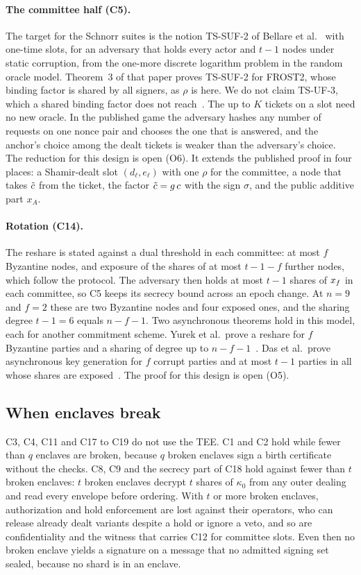 \paragraph{The committee half (C5).} The target for the Schnorr suites is the notion TS-SUF-2 of Bellare et al.~\cite{BTA22} with one-time slots, for an adversary that holds every actor and $t - 1$ nodes under static corruption, from the one-more discrete logarithm problem in the random oracle model. Theorem~3 of that paper proves TS-SUF-2 for FROST2, whose binding factor is shared by all signers, as $\rho$ is here. We do not claim TS-UF-3, which a shared binding factor does not reach~\cite[Section~4.4]{BTA22}. The up to $K$ tickets on a slot need no new oracle. In the published game the adversary hashes any number of requests on one nonce pair and chooses the one that is answered, and the anchor's choice among the dealt tickets is weaker than the adversary's choice. The reduction for this design is open (O6). It extends the published proof in four places: a Shamir-dealt slot $(d_\ell, e_\ell)$ with one $\rho$ for the committee, a node that takes $\tilde{c}$ from the ticket, the factor $\tilde{c} = g\,c$ with the sign $\sigma$, and the public additive part $x_A$.

\paragraph{Rotation (C14).} The reshare is stated against a dual threshold in each committee: at most $f$ Byzantine nodes, and exposure of the shares of at most $t - 1 - f$ further nodes, which follow the protocol. The adversary then holds at most $t - 1$ shares of $x_{f}$ in each committee, so C5 keeps its secrecy bound across an epoch change. At $n = 9$ and $f = 2$ these are two Byzantine nodes and four exposed ones, and the sharing degree $t - 1 = 6$ equals $n - f - 1$. Two asynchronous theorems hold in this model, each for another commitment scheme. Yurek et al.\ prove a reshare for $f$ Byzantine parties and a sharing of degree up to $n - f - 1$~\cite[Theorem~1]{YXXM23}. Das et al.\ prove asynchronous key generation for $f$ corrupt parties and at most $t - 1$ parties in all whose shares are exposed~\cite[Theorem~1]{DXKR23}. The proof for this design is open (O5).

\subsection{When enclaves break}\label{sec:tee-break}

C3, C4, C11 and C17 to C19 do not use the TEE. C1 and C2 hold while fewer than $q$ enclaves are broken, because $q$ broken enclaves sign a birth certificate without the checks. C8, C9 and the secrecy part of C18 hold against fewer than $t$ broken enclaves: $t$ broken enclaves decrypt $t$ shares of $\kappa_0$ from any outer dealing and read every envelope before ordering. With $t$ or more broken enclaves, authorization and hold enforcement are lost against their operators, who can release already dealt variants despite a hold or ignore a veto, and so are confidentiality and the witness that carries C12 for committee slots. Even then no broken enclave yields a signature on a message that no admitted signing set sealed, because no shard is in an enclave.
